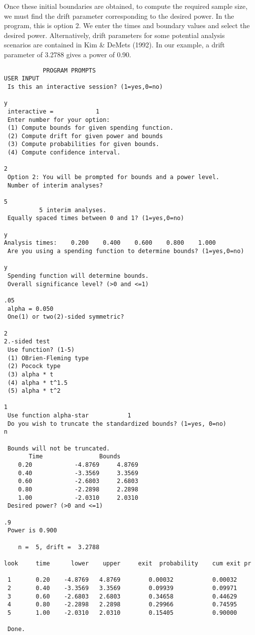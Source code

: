 Once these initial boundaries are obtained, to compute the required sample
size, we must find the drift parameter corresponding to the desired power.
In the program, this is option 2.  We enter the times and boundary values
and select the desired power.  Alternatively, drift parameters for some
potential analysis scenarios are contained in Kim \& DeMets (1992).  In our
example, a drift parameter of 3.2788 gives a power of 0.90.  {\singlespace
{\scriptsize
\begin{verbatim}
           PROGRAM PROMPTS                                                USER INPUT
 Is this an interactive session? (1=yes,0=no)
                                                                              y
 interactive =            1
 Enter number for your option:
 (1) Compute bounds for given spending function.
 (2) Compute drift for given power and bounds
 (3) Compute probabilities for given bounds.
 (4) Compute confidence interval.
                                                                              2
 Option 2: You will be prompted for bounds and a power level.
 Number of interim analyses?
                                                                              5
          5 interim analyses.
 Equally spaced times between 0 and 1? (1=yes,0=no)
                                                                              y
Analysis times:    0.200    0.400    0.600    0.800    1.000
 Are you using a spending function to determine bounds? (1=yes,0=no)
                                                                              y
 Spending function will determine bounds.
 Overall significance level? (>0 and <=1)
                                                                              .05
 alpha = 0.050
 One(1) or two(2)-sided symmetric?
                                                                              2
2.-sided test
 Use function? (1-5)
 (1) OBrien-Fleming type
 (2) Pocock type
 (3) alpha * t
 (4) alpha * t^1.5
 (5) alpha * t^2
                                                                              1
 Use function alpha-star           1
 Do you wish to truncate the standardized bounds? (1=yes, 0=no)               n

 Bounds will not be truncated.
       Time                Bounds
    0.20            -4.8769     4.8769
    0.40            -3.3569     3.3569
    0.60            -2.6803     2.6803
    0.80            -2.2898     2.2898
    1.00            -2.0310     2.0310
 Desired power? (>0 and <=1)
                                                                              .9
 Power is 0.900

    n =  5, drift =  3.2788

look     time      lower    upper     exit  probability    cum exit pr

 1       0.20    -4.8769   4.8769        0.00032           0.00032
 2       0.40    -3.3569   3.3569        0.09939           0.09971
 3       0.60    -2.6803   2.6803        0.34658           0.44629
 4       0.80    -2.2898   2.2898        0.29966           0.74595
 5       1.00    -2.0310   2.0310        0.15405           0.90000

 Done.
\end{verbatim}}}
